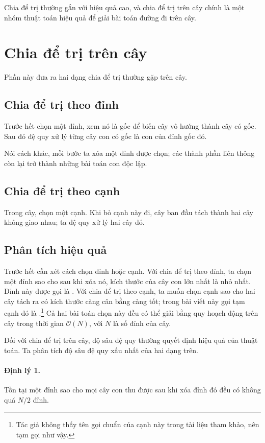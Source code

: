 \documentclass[11pt]{article}
\newcommand{\Oh}{\mathcal{O}}
\begin{document}
Chia để trị thường gắn với hiệu quả cao, và chia để trị trên cây chính là một
nhóm thuật toán hiệu quả để giải bài toán đường đi trên cây.

\section{Chia để trị trên cây}

Phần này đưa ra hai dạng chia để trị thường gặp trên cây.

\subsection{Chia để trị theo đỉnh}

Trước hết chọn một đỉnh, xem nó là gốc để biến cây vô hướng thành cây có gốc.
Sau đó đệ quy xử lý từng cây con có gốc là con của đỉnh gốc đó.

Nói cách khác, mỗi bước ta xóa một đỉnh được chọn; các thành phần liên thông
còn lại trở thành những bài toán con độc lập.

\subsection{Chia để trị theo cạnh}

Trong cây, chọn một cạnh. Khi bỏ cạnh này đi, cây ban đầu tách thành hai cây
không giao nhau; ta đệ quy xử lý hai cây đó.

\subsection{Phân tích hiệu quả}

Trước hết cần xét cách chọn đỉnh hoặc cạnh. Với chia để trị theo đỉnh, ta chọn
một đỉnh sao cho sau khi xóa nó, kích thước của cây con lớn nhất là nhỏ nhất.
Đỉnh này được gọi là . Với chia để trị theo cạnh, ta
muốn chọn cạnh sao cho hai cây tách ra có kích thước càng cân bằng càng tốt;
trong bài viết này gọi tạm cạnh đó là .\footnote{Tác giả
không thấy tên gọi chuẩn của cạnh này trong tài liệu tham khảo, nên tạm gọi
như vậy.} Cả hai bài toán chọn này đều có thể giải bằng quy hoạch động trên
cây trong thời gian \(\Oh(N)\), với \(N\) là số đỉnh của cây.

Đối với chia để trị trên cây, độ sâu đệ quy thường quyết định hiệu quả của
thuật toán. Ta phân tích độ sâu đệ quy xấu nhất của hai dạng trên.

\paragraph{Định lý 1.}
Tồn tại một đỉnh sao cho mọi cây con thu được sau khi xóa đỉnh đó đều có
không quá \(N/2\) đỉnh.
\end{document}
